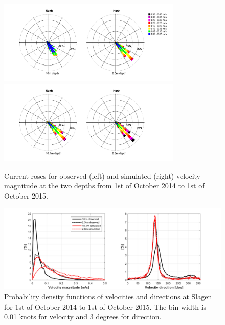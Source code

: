 \begin{figure}[ht]
\centerline{
\includegraphics*[trim=2cm 1cm 1cm 0cm,clip=true,height=4cm]{Figurer/Slagen_Rose_obs} 
\includegraphics*[trim=2cm 1cm 3cm 0cm,clip=true,height=4cm]{Figurer/Slagen_Rose_sim}
}
\caption{\small
Current roses for observed (left) and simulated (right) velocity magnitude at the two depths from 1st of October 2014 to 1st of October 2015.}
\label{fig:Slagen-rose}
\end{figure}

\begin{figure}[t]
\centerline{
\includegraphics*[trim=2cm 0cm 2cm 0cm,clip=true,width=\textwidth]{Figurer/Slagen_pdf} 
}
\caption{\small
Probability density functions of velocities and directions at Slagen for 1st of October 2014 to 1st of October 2015. The bin width is 0.01 knots for velocity and 3 degrees for direction.}
\label{fig:Slagen-pdf}
\end{figure}

